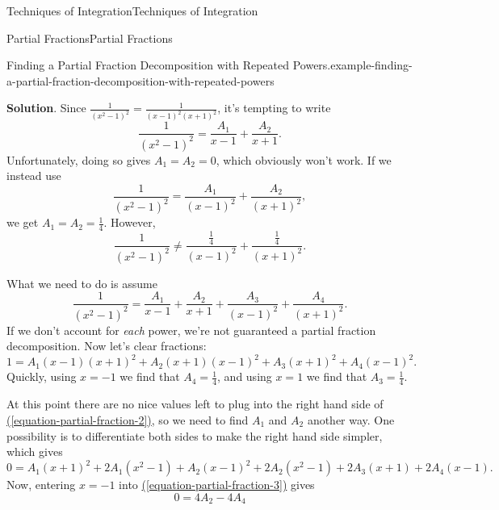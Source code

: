 \documentclass[10pt,]{book}
\numberwithin{equation}{section}
\begin{document}
\begin{chapterptx}{Techniques of Integration}{}{Techniques of Integration}{}{}
\begin{sectionptx}{Partial Fractions}{}{Partial Fractions}{}{}
\begin{example}{Finding a Partial Fraction Decomposition with Repeated Powers.}{example-finding-a-partial-fraction-decomposition-with-repeated-powers}
\par\smallskip%
\noindent\textbf{Solution}.\hypertarget{solution-122}{}\quad%
\hypertarget{p-556}{}%
Since \(\frac{1}{(x^{2} - 1)^{2}} = \frac{1}{(x-1)^{2}(x+1)^{2}}\), it's tempting to write%
\begin{equation*}
\frac{1}{(x^{2}-1)^{2}} = \frac{A_{1}}{x-1} + \frac{A_{2}}{x+1}.
\end{equation*}
Unfortunately, doing so gives \(A_{1} = A_{2} = 0\), which obviously won't work. If we instead use%
\begin{equation*}
\frac{1}{(x^{2}-1)^{2}} = \frac{A_{1}}{(x-1)^{2}} + \frac{A_{2}}{(x+1)^{2}},
\end{equation*}
we get \(A_{1} = A_{2} = \frac{1}{4}\). However,%
\begin{equation*}
\frac{1}{(x^{2}-1)^{2}} \neq \frac{\frac{1}{4}}{(x-1)^{2}} + \frac{\frac{1}{4}}{(x+1)^{2}}.
\end{equation*}
%
\par
\hypertarget{p-557}{}%
What we need to do is assume%
\begin{equation*}
\frac{1}{(x^{2}-1)^{2}} = \frac{A_{1}}{x-1} + \frac{A_{2}}{x+1} + \frac{A_{3}}{(x-1)^{2}} + \frac{A_{4}}{(x+1)^{2}}.
\end{equation*}
If we don't account for \emph{each} power, we're not guaranteed a partial fraction decomposition. Now let's clear fractions:%
\begin{equation}
1 = A_{1}(x-1)(x+1)^{2} + A_{2}(x+1)(x-1)^{2} + A_{3}(x+1)^{2} + A_{4}(x-1)^{2}.\label{equation-partial-fraction-2}
\end{equation}
Quickly, using \(x=-1\) we find that \(A_{4} = \frac{1}{4}\), and using \(x = 1\) we find that \(A_{3} = \frac{1}{4}\).%
\par
\hypertarget{p-558}{}%
At this point there are no nice values left to plug into the right hand side of \hyperref[equation-partial-fraction-2]{(\ref{equation-partial-fraction-2})}, so we need to find \(A_{1}\) and \(A_{2}\) another way. One possibility is to differentiate both sides to make the right hand side simpler, which gives%
\begin{equation}
0 = A_{1}(x+1)^{2} + 2A_{1}(x^{2}-1) + A_{2}(x-1)^{2} + 2A_{2}(x^{2} - 1) + 2A_{3}(x+1) + 2A_{4}(x-1).\label{equation-partial-fraction-3}
\end{equation}
Now, entering \(x = -1\) into \hyperref[equation-partial-fraction-3]{(\ref{equation-partial-fraction-3})} gives%
\begin{equation*}
0 = 4A_{2} - 4A_{4}
\end{equation*}

\end{example}
\end{sectionptx}
\end{chapterptx}
\end{document}
